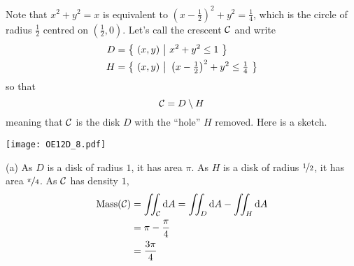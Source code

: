 \begin{solution}
Note that $x^2+y^2=x$ is equivalent to
$\left(x-\frac{1}{2}\right)^2+y^2=\frac{1}{4}$, which is the
circle of radius $\frac{1}{2}$ centred on $\left(\frac{1}{2},0\right)$.
Let's call the crescent $\mathcal{C}$ and write
\begin{align*}
D &= \big\{ \ (x,y)\ \big|\ x^2+y^2\le 1\ \big\} \\
H &= \big\{ \ (x,y)\ \big|\ \left(x-\tfrac{1}{2}\right)^2+y^2\le\tfrac{1}{4}\ \big\}
\end{align*}
so that
\begin{equation*}
\mathcal{C}= D\setminus H
\end{equation*}
meaning that $\mathcal{C}$ is the disk $D$ with the ``hole'' $H$ removed.
Here is a sketch.

\begin{center}
     \texttt{[image: OE12D\_8.pdf]}
\end{center}

(a) As $D$ is a disk of radius $1$, it has area $\pi$.
    As $H$ is a disk of radius $\nicefrac{1}{2}$, it has 
           area $\nicefrac{\pi}{4}$.
As $\mathcal{C}$ has density $1$, 
\begin{align*}
\text{Mass}(\mathcal{C}) &= \iint_{\mathcal{C}} \mathrm{d}A
                  = \iint_D\mathrm{d}A -\iint_H\mathrm{d}A \\
   &=\pi - \frac{\pi}{4} \\
   &=\frac{3\pi}{4}
\end{align*}




\end{solution}
